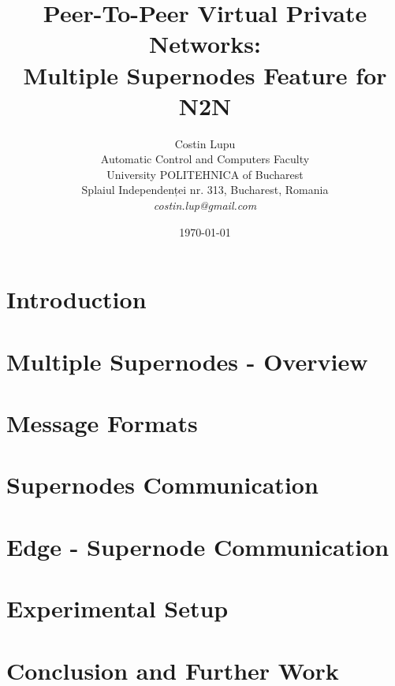 \documentclass[12pt]{article}
\title{Peer-To-Peer Virtual Private Networks:\\
Multiple Supernodes Feature for N2N}
\author{Costin Lupu\\
Automatic Control and Computers Faculty\\
University POLITEHNICA of Bucharest\\
Splaiul Independenței nr. 313, Bucharest, Romania \\
\emph{costin.lup@gmail.com}}
\date{\today}
\begin{document}
\maketitle

\begin{abstract}

\end{abstract}

\section{Introduction}
\label{sec:introduction}


\section{Multiple Supernodes - Overview}
\label{sec:overview}


\section{Message Formats}
\label{sec:message-formats}


\section{Supernodes Communication}
\label{sec:supernodes-communication}


\section{Edge - Supernode Communication}
\label{sec:edge-supernode-communication}


\section{Experimental Setup}
\label{sec:setup}


\section{Conclusion and Further Work}
\label{sec:conclusion}




\end{document}
